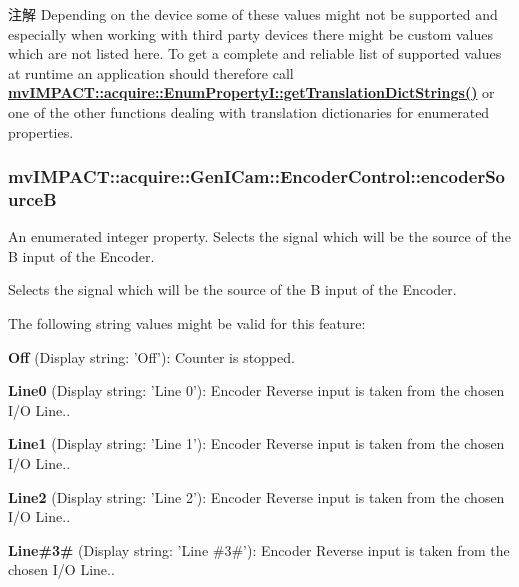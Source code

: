 \begin{DoxyNote}{注解}
Depending on the device some of these values might not be supported and especially when working with third party devices there might be custom values which are not listed here. To get a complete and reliable list of supported values at runtime an application should therefore call {\bfseries \hyperlink{classmv_i_m_p_a_c_t_1_1acquire_1_1_enum_property_i_a0ba6ccbf5ee69784d5d0b537924d26b6}{mv\+I\+M\+P\+A\+C\+T\+::acquire\+::\+Enum\+Property\+I\+::get\+Translation\+Dict\+Strings()}} or one of the other functions dealing with translation dictionaries for enumerated properties. 
\end{DoxyNote}
\hypertarget{classmv_i_m_p_a_c_t_1_1acquire_1_1_gen_i_cam_1_1_encoder_control_a05d60aa41efeeecd3682c8f3ffc01cd6}{
\subsubsection[{encoder\+Source\+B}]{ mv\+I\+M\+P\+A\+C\+T\+::acquire\+::\+Gen\+I\+Cam\+::\+Encoder\+Control\+::encoder\+Source\+B}}\label{classmv_i_m_p_a_c_t_1_1acquire_1_1_gen_i_cam_1_1_encoder_control_a05d60aa41efeeecd3682c8f3ffc01cd6}


An enumerated integer property. Selects the signal which will be the source of the B input of the Encoder. 

Selects the signal which will be the source of the B input of the Encoder.

The following string values might be valid for this feature\+:
\begin{DoxyItemize}
\item {\bfseries Off} (Display string\+: 'Off')\+: Counter is stopped.
\item {\bfseries Line0} (Display string\+: 'Line 0')\+: Encoder Reverse input is taken from the chosen I/\+O Line..
\item {\bfseries Line1} (Display string\+: 'Line 1')\+: Encoder Reverse input is taken from the chosen I/\+O Line..
\item {\bfseries Line2} (Display string\+: 'Line 2')\+: Encoder Reverse input is taken from the chosen I/\+O Line..
\item {\bfseries Line\#3\#} (Display string\+: 'Line \#3\#')\+: Encoder Reverse input is taken from the chosen I/\+O Line..
\end{DoxyItemize}

